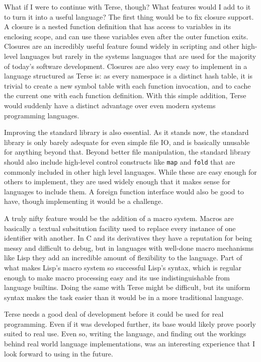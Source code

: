 \documentclass[12pt]{report}
\newcommand{\code}[1]{\texttt{#1}}
\begin{document}
What if I were to continue with Terse, though? What features would I
add to it to turn it into a useful language? The first thing would be
to fix closure support. A closure is a nested function definition that
has access to variables in its enclosing scope, and can use these
variables even after the outer function exits. Closures are an
incredibly useful feature found widely in scripting and other
high-level languages but rarely in the systems languages that are used
for the majority of today's software
development\footnotemark{}. Closures are also very easy to implement
in a language structured as Terse is: as every namespace is a distinct
hash table, it is trivial to create a new symbol table with each
function invocation, and to cache the current one with each function
definition. With this simple addition, Terse would suddenly have a
distinct advantage over even modern systems programming languages.


Improving the standard library is also essential. As it stands now,
the standard library is only barely adequate for even simple file IO,
and is basically unusable for anything beyond that. Beyond better file
manipulation, the standard library should also include high-level
control constructs like \code{map} and \code{fold} that are commonly
included in other high level languages. While these are easy enough
for others to implement, they are used widely enough that it makes
sense for languages to include them. A foreign function
interface\footnotemark{} would also be good to have, though
implementing it would be a challenge.


A truly nifty feature would be the addition of a macro system. Macros
are basically a textual subsitution facility used to replace every
instance of one identifier with another. In C and its derivatives they
have a reputation for being messy and difficult to debug, but in
languages with well-done macro mechanisms like Lisp they add an
incredible amount of flexibility to the language. Part of what makes
Lisp's macro system so successful Lisp's syntax, which is regular
enough to make macro processing easy and its use indistinguishable
from language builtins. Doing the same with Terse might be difficult,
but its uniform syntax makes the task easier than it would be in a
more traditional language.

Terse needs a good deal of development before it could be used for
real programming. Even if it was developed further, its base would
likely prove poorly suited to real use. Even so, writing the language,
and finding out the workings behind real world language
implementations, was an interesting experience that I look forward to
using in the future.

\clearpage

\printbibliography
\end{document}
